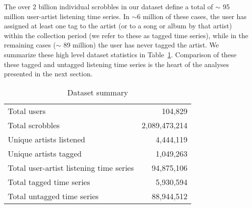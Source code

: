 The over 2 billion individual scrobbles in our dataset define a total of $\sim$ 95 million user-artist listening time series. In $\sim 6$ million of these cases, the user has assigned at least one tag to the artist (or to a song or album by that artist) within the collection period (we refer to these as tagged time series), while in the remaining cases ($\sim$ 89 million) the user has never tagged the artist. We summarize these high level dataset statistics in Table~\ref{tab:data_summary}. Comparison of these these tagged and untagged listening time series is the heart of the analyses presented in the next section.

\begin{table}[h]
\begin{center}
\begin{tabular}{l|r}
\toprule
Total users & 104,829 \\
Total scrobbles & 2,089,473,214 \\
Unique artists listened & 4,444,119 \\
Unique artists tagged & 1,049,263 \\
\midrule
Total user-artist listening time series & 94,875,106 \\
Total tagged time series & 5,930,594 \\
Total untagged time series & 88,944,512 \\
\bottomrule
\end{tabular}
\end{center}
\caption{Dataset summary}
\label{tab:data_summary}
\end{table}

